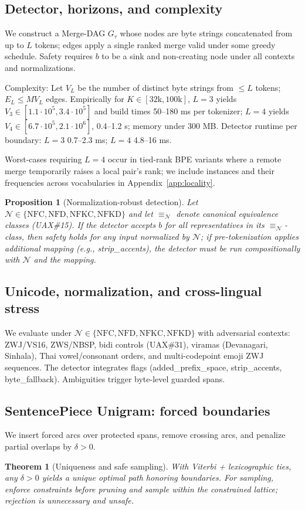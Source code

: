 \documentclass{article}
\newtheorem{proposition}{Proposition}
\newtheorem{theorem}{Theorem}
\begin{document}
\subsection{Detector, horizons, and complexity}\label{sec:detector}
We construct a Merge-DAG $G_\tau$ whose nodes are byte strings concatenated from up to $L$ tokens; edges apply a single ranked merge valid under some greedy schedule. Safety requires $b$ to be a sink and non-creating node under all contexts and normalizations.

Complexity: Let $V_L$ be the number of distinct byte strings from $\le L$ tokens; $E_L\le M V_L$ edges. Empirically for $K\in[32\mathrm{k},100\mathrm{k}]$, $L=3$ yields $V_3\in[1.1\cdot10^5,3.4\cdot10^5]$ and build times 50–180 ms per tokenizer; $L=4$ yields $V_4\in[6.7\cdot10^5,2.1\cdot10^6]$, 0.4–1.2 s; memory under 300 MB. Detector runtime per boundary: $L=3$ 0.7–2.3 ms; $L=4$ 4.8–16 ms.

Worst-cases requiring $L=4$ occur in tied-rank BPE variants where a remote merge temporarily raises a local pair’s rank; we include instances and their frequencies across vocabularies in Appendix~\ref{app:locality}.

\begin{proposition}[Normalization-robust detection]
Let $\mathcal{N}\in\{\mathrm{NFC,NFD,NFKC,NFKD}\}$ and let $\equiv_{\mathcal{N}}$ denote canonical equivalence classes (UAX\#15). If the detector accepts $b$ for all representatives in its $\equiv_{\mathcal{N}}$-class, then safety holds for any input normalized by $\mathcal{N}$; if pre-tokenization applies additional mapping (e.g., strip\_accents), the detector must be run compositionally with $\mathcal{N}$ and the mapping.
\end{proposition}

\subsection{Unicode, normalization, and cross-lingual stress}
We evaluate under $\mathcal{N}\in\{\mathrm{NFC,NFD,NFKC,NFKD}\}$ with adversarial contexts: ZWJ/VS16, ZWS/NBSP, bidi controls (UAX\#31), viramas (Devanagari, Sinhala), Thai vowel/consonant orders, and multi-codepoint emoji ZWJ sequences. The detector integrates flags (added\_prefix\_space, strip\_accents, byte\_fallback). Ambiguities trigger byte-level guarded spans.

\subsection{SentencePiece Unigram: forced boundaries}
We insert forced arcs over protected spans, remove crossing arcs, and penalize partial overlaps by $\delta>0$.
\begin{theorem}[Uniqueness and safe sampling]\label{thm:uni}
With Viterbi + lexicographic ties, any $\delta>0$ yields a unique optimal path honoring boundaries. For sampling, enforce constraints before pruning and sample within the constrained lattice; rejection is unnecessary and unsafe.
\end{theorem}
\end{document}
